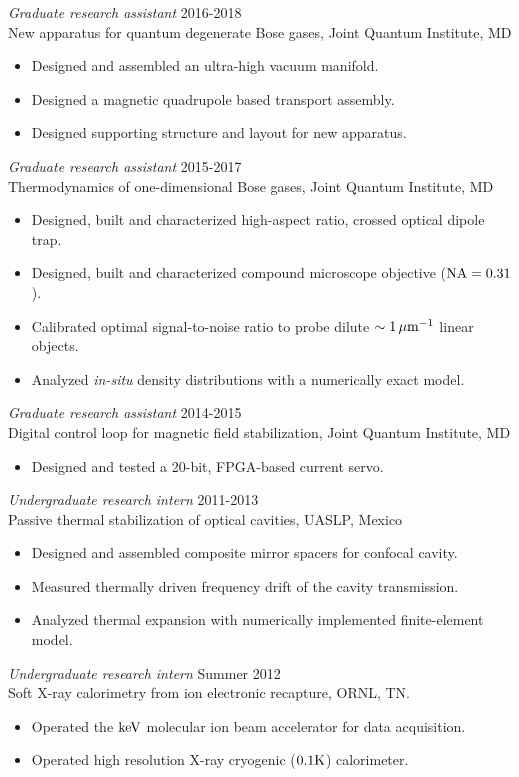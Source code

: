 \documentclass[margin, 10pt]{res} %
\begin{document}
\begin{resume}
{\sl Graduate research assistant} \hfill 2016-2018 \\
New apparatus for quantum degenerate Bose gases, Joint Quantum Institute, MD
\begin{itemize} \itemsep -2pt
\item Designed and assembled an ultra-high vacuum manifold.
\item Designed a magnetic quadrupole based transport assembly.
\item Designed supporting structure and layout for new apparatus.
\end{itemize} 

{\sl Graduate research assistant} \hfill 2015-2017 \\
Thermodynamics of one-dimensional Bose gases, Joint Quantum Institute, MD
\begin{itemize} \itemsep -2pt
\item Designed, built and characterized high-aspect ratio, crossed optical dipole trap.
\item Designed, built and characterized compound microscope objective (${{\rm NA} = 0.31}$).
\item Calibrated optimal signal-to-noise ratio to probe dilute ${\sim 1 \,{\rm \mu m ^{-1}}}$ linear objects.
\item Analyzed {\it in-situ} density distributions with a numerically exact model.
\end{itemize} 

{\sl Graduate research assistant} \hfill 2014-2015 \\
Digital control loop for magnetic field stabilization, Joint Quantum Institute, MD
\begin{itemize} \itemsep -2pt
\item Designed and tested a 20-bit, FPGA-based current servo.
\end{itemize} 

{\sl Undergraduate research intern} \hfill 2011-2013 \\
Passive thermal stabilization of optical cavities, UASLP, Mexico 
\begin{itemize} \itemsep -2pt
\item Designed and assembled composite mirror spacers for confocal cavity.
\item Measured thermally driven frequency drift of the cavity transmission. 
\item Analyzed thermal expansion with numerically implemented finite-element model.
\end{itemize}
 
{\sl Undergraduate research intern} \hfill Summer 2012 \\
Soft X-ray calorimetry from ion electronic recapture, ORNL, TN.
\begin{itemize} \itemsep -2pt
\item Operated the ${{\rm keV}}$ molecular ion beam accelerator for data acquisition.
\item Operated high resolution X-ray cryogenic (${0.1 {\rm K}}$) calorimeter.
\end{itemize} 

\end{resume}
\end{document}
